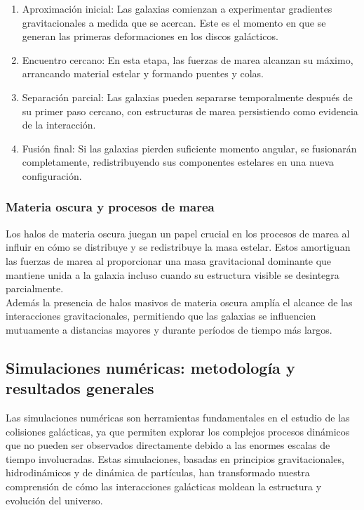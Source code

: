 \documentclass{article}
\begin{document}
\begin{enumerate}
    \item Aproximación inicial:
Las galaxias comienzan a experimentar gradientes gravitacionales a medida que se acercan. Este es el momento en que se generan las primeras deformaciones en los discos galácticos.

    \item Encuentro cercano:
En esta etapa, las fuerzas de marea alcanzan su máximo, arrancando material estelar y formando puentes y colas.

    \item Separación parcial:
Las galaxias pueden separarse temporalmente después de su primer paso cercano, con estructuras de marea persistiendo como evidencia de la interacción.

    \item Fusión final:
Si las galaxias pierden suficiente momento angular, se fusionarán completamente, redistribuyendo sus componentes estelares en una nueva configuración.
\end{enumerate}

\subsubsection{Materia oscura y procesos de marea}
Los halos de materia oscura juegan un papel crucial en los procesos de marea al influir en cómo se distribuye y se redistribuye la masa estelar. Estos amortiguan las fuerzas de marea al proporcionar una masa gravitacional dominante que mantiene unida a la galaxia incluso cuando su estructura visible se desintegra parcialmente. \\
Además la presencia de halos masivos de materia oscura amplía el alcance de las interacciones gravitacionales, permitiendo que las galaxias se influencien mutuamente a distancias mayores y durante períodos de tiempo más largos.

\subsection{Simulaciones numéricas: metodología y resultados generales}
Las simulaciones numéricas son herramientas fundamentales en el estudio de las colisiones galácticas, ya que permiten explorar los complejos procesos dinámicos que no pueden ser observados directamente debido a las enormes escalas de tiempo involucradas. Estas simulaciones, basadas en principios gravitacionales, hidrodinámicos y de dinámica de partículas, han transformado nuestra comprensión de cómo las interacciones galácticas moldean la estructura y evolución del universo.
\end{document}
